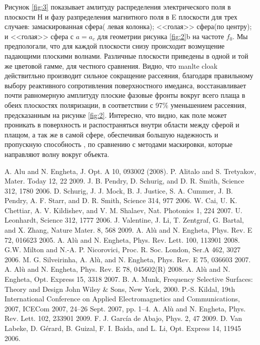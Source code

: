 \documentclass[12pt,a4paper]{article}
\begin{document}
Рисунок \ref{fig:3} показывает амлитуду распределения электрического поля в плоскости Н и
фазу разпределения магнитного поля в E плоскости для трех случаев: замаскированная сфера(
левая колонка); <<голая>> сфера(по центру); и <<голая>> сфера с $a=a_c$ для геометрии
рисунка \ref{fig:2}b на частоте $f_0$. Мы предпологали, что для каждой плоскости снизу
происходит возмущение падающими плоскими волнами. Различные плоскости приведены в одной и той
же цветовой гамме, для честного сравнения. Видно, что manlte cloak действитльно производит
сильное сокращение рассеяния, благодаря правильному выбору реактивного сопротивления 
поверхностного имеданса, восстанавливает почти равномерную амплитуду плоские фазовые фронты
вокруг всего плаща в обеих плоскостях поляризации, в соответствии с 97\% уменьшением
рассеяния, предсказанным на рисунке \ref{fig:2}. Интересно, что видно, как поле может
проникать в поверхность и распостраняться внутри области между сферой и плащом, а так же в 
самой сфере, обеспечивая большую надежность и пропускную способность \cite{12}, по сравнению
с методами маскировки, которые направляют волну вокруг объекта.

\begin{thebibliography}{99}
A. Alu and N. Engheta, J. Opt. A 10, 093002 (2008).
P. Alitalo and S. Tretyakov, Mater. Today 12, 22 2009.
J. B. Pendry, D. Schurig, and D. R. Smith, Science 312, 1780 2006.
D. Schurig, J. J. Mock, B. J. Justice, S. A. Cummer, J. B. Pendry, A. F. Starr, 
and D. R. Smith, Science 314, 977 2006.
W. Cai, U. K. Chettiar, A. V. Kildishev, and V. M. Shalaev, Nat.
Photonics 1, 224 2007.
U. Leonhardt, Science 312, 1777 2006.
J. Valentine, J. Li, T. Zentgraf, G. Bartal, and X. Zhang, Nature
Mater. 8, 568 2009.
A. Alù and N. Engheta, Phys. Rev. E 72, 016623 2005.
A. Alù and N. Engheta, Phys. Rev. Lett. 100, 113901 2008.
G.W. Milton and N.-A. P. Nicorovici, Proc. R. Soc. London, Ser.A 462, 3027 
2006.
M. G. Silveirinha, A. Alù, and N. Engheta, Phys. Rev. E 75,
036603 2007.
A. Alù and N. Engheta, Phys. Rev. E 78, 045602(R) 2008.
A. Alù and N. Engheta, Opt. Express 15, 3318 2007.
B. A. Munk, Frequency Selective Surfaces: Theory and Design John Wiley \& Sons,
 New York, 2000.
P.-S. Kildal, 19th International Conference on Applied Electromagnetics
and Communications, 2007, ICECom 2007, 24–26 Sept. 2007, pp. 1–4.
A. Alù and N. Engheta, Phys. Rev. Lett. 102, 233901 2009.
F. J. García de Abajo, Phys. 2, 47 2009.
D. Van Labeke, D. Gérard, B. Guizal, F. I. Baida, and L. Li, Opt.
Express 14, 11945 2006.
\end{thebibliography}
\end{document}
